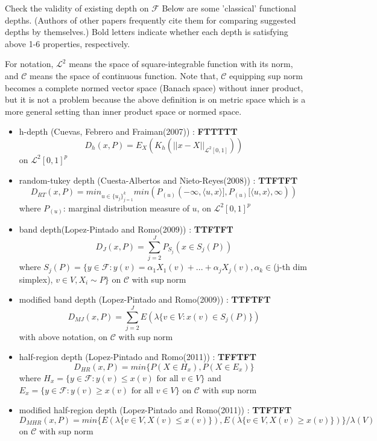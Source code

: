 \documentclass[aspectratio=169,ignorenonframetext,9pt]{beamer}
\theoremstyle{plain}
\theoremstyle{definition}
\begin{document}
\begin{frame}{Check the validity of existing depth on $\mathcal{F}$}
Below are some 'classical' functional depths.
(Authors of other papers frequently cite them
for comparing suggested depths by themselves.)
Bold letters indicate whether each depth is satisfying above 1-6 properties, respectively.

For notation, $\mathcal{L}^2$ means the space of square-integrable function with its norm,
and $\mathcal{C}$ means the space of continuous function.
Note that, $\mathcal{C}$ equipping sup norm becomes a complete normed vector space (Banach space)
without inner product, but it is not a problem because the above definition is on metric space
which is a more general setting than inner product space or normed space.

\begin{itemize}
    \item h-depth (Cuevas, Febrero and Fraiman(2007)) : \textbf{FTTTTT}
    \[D_h(x,P)=E_X(K_h(||x-X||_{\mathcal{L}^2[0,1]}))\] on $\mathcal{L}^2[0,1]^p$ 
    \item random-tukey depth (Cuesta-Albertos and Nieto-Reyes(2008)) : \textbf{TTFTFT}\\
    \[D_{RT}(x,P)=min_{u\in\{u_j\}_{j=1}^k}min(P_{(u)}(-\infty,\langle u,x \rangle], P_{(u)}[\langle u,x \rangle,\infty))\]
    where $P_{(u)}$: marginal distribution measure of $u$, on $\mathcal{L}^2[0,1]^p$
    \item band depth(Lopez-Pintado and Romo(2009)) : \textbf{TTFTFT}
    \[D_J(x,P)=\sum_{j=2}^J P_{S_j}(x\in S_j(P))\] 
    where $S_j(P)=\{y\in\mathcal{F} : y(v)=\alpha_1X_1(v)+...+\alpha_jX_j(v), \alpha_k\in$(j-th dim simplex), $v\in V, X_i\sim P\}$
    on $\mathcal{C}$ with sup norm 
    \item modified band depth (Lopez-Pintado and Romo(2009)) : \textbf{TTFTFT}
    \[D_{MJ}(x,P)=\sum_{j=2}^J E(\lambda \{v\in V : x(v)\in S_j(P)\})\] 
    with above notation, on $\mathcal{C}$ with sup norm 
    \item half-region depth (Lopez-Pintado and Romo(2011)) : \textbf{TFFTFT}
    \[D_{HR}(x,P)=min\{P(X\in H_x), P(X\in E_x)\}\]
    where $H_x=\{y\in\mathcal{F} : y(v)\leq x(v) \text{ for all } v\in V\}$ and 
    $E_x=\{y\in\mathcal{F} : y(v)\geq x(v) \text{ for all } v\in V\}$ on $\mathcal{C}$ with sup norm 
    \item modified half-region depth (Lopez-Pintado and Romo(2011)) : \textbf{TTFTFT}
    \[D_{MHR}(x,P)=min\{E(\lambda\{v\in V, X(v)\leq x(v)\}), E(\lambda\{v\in V, X(v)\geq x(v)\})\}/\lambda(V)\]
    on $\mathcal{C}$ with sup norm
\end{itemize}

\end{frame}
\end{document}
